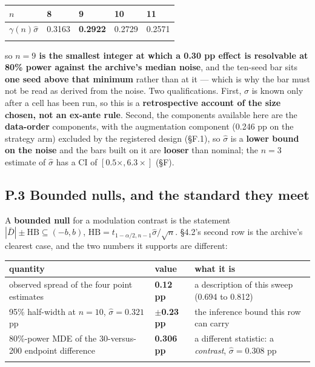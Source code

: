\documentclass[pdflatex,sn-mathphys-ay]{sn-jnl}
\begin{document}
\begin{center}
{\small
\begin{tabular}{lllll}
\toprule
$n$ & 8 & \textbf{9} & 10 & 11 \\
\midrule
$\gamma(n)\hat\sigma$ & 0.3163 & \textbf{0.2922} & 0.2729 & 0.2571 \\
\botrule
\end{tabular}}
\end{center}

so \textbf{$n=9$ is the smallest integer at which a 0.30 pp effect is resolvable at 80\% power against the archive's median noise}, and the ten-seed bar sits \textbf{one seed above that minimum} rather than at it --- which is why the bar must not be read as derived from the noise. Two qualifications. First, $\hat\sigma$ is known only after a cell has been run, so this is a \textbf{retrospective account of the size chosen, not an ex-ante rule}. Second, the components available here are the \textbf{data-order} components, with the augmentation component (0.246 pp on the strategy arm) excluded by the registered design (\S{}F.1), so $\hat\sigma$ is a \textbf{lower bound on the noise} and the bars built on it are \textbf{looser} than nominal; the $n=3$ estimate of $\hat\sigma$ has a CI of $[0.5\times,6.3\times]$ (\S{}F).

\subsection*{P.3 Bounded nulls, and the standard they meet}

A \textbf{bounded null} for a modulation contrast is the statement $|\bar D|\pm \mathrm{HB}\subseteq(-b,b)$, $\mathrm{HB}=t_{1-\alpha/2,n-1}\hat\sigma/\sqrt n$. \S{}4.2's second row is the archive's clearest case, and the two numbers it supports are different:

{\footnotesize
\setlength{\tabcolsep}{4pt}
\begin{longtable}{p{}p{}p{}}
\toprule
quantity & value & what it is \\
\midrule
\endhead
observed spread of the four point estimates & \textbf{0.12 pp} & a description of this sweep (0.694 to 0.812) \\
95\% half-width at $n=10$, $\hat\sigma=0.321$ pp & \textbf{\ensuremath{\pm}0.23 pp} & the inference bound this row can carry \\
80\%-power MDE of the 30-versus-200 endpoint difference & \textbf{0.306 pp} & a different statistic: a \emph{contrast}, $\hat\sigma=0.308$ pp \\
\botrule
\end{longtable}}
\end{document}
